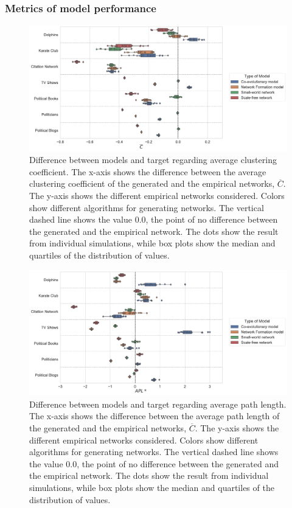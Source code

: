 \documentclass[11pt]{article}
\begin{document}
\subsubsection{Metrics of model performance}
\begin{figure}[H]
    \centering
    \includegraphics[width=.9\linewidth]{../plots/overall/Model_Evaluation_Average_Clustering.pdf}
  \caption{Difference between models and target regarding average clustering coefficient. The x-axis shows the difference between the average clustering coefficient of the generated and the empirical networks, $\overline{C}$. The y-axis shows the different empirical networks considered. Colors show different algorithms for generating networks. The vertical dashed line shows the value 0.0, the point of no difference between the generated and the empirical network. The dots show the result from individual simulations, while box plots show the median and quartiles of the distribution of values.}
  \label{appendix:eval_clustering}
\end{figure}

\begin{figure}[H]
    \centering
    \includegraphics[width=.9\linewidth]{../plots/overall/Model_Evaluation_APL.pdf}
  \caption{Difference between models and target regarding average path length. The x-axis shows the difference between the average path length of the generated and the empirical networks, $\overline{C}$. The y-axis shows the different empirical networks considered. Colors show different algorithms for generating networks. The vertical dashed line shows the value 0.0, the point of no difference between the generated and the empirical network. The dots show the result from individual simulations, while box plots show the median and quartiles of the distribution of values.}
  \label{appendix:eval_path}
\end{figure}
\end{document}
